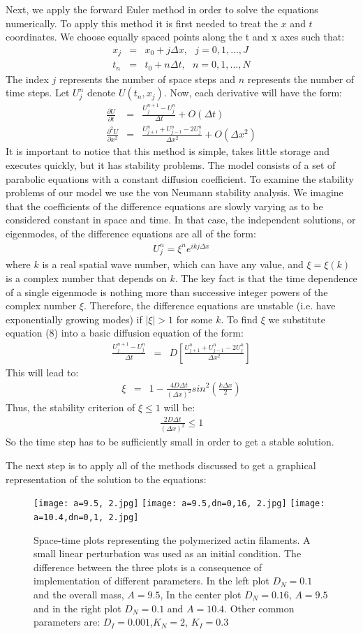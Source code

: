 \documentclass[aps,pre,floats,floatfix,twocolumn]{revtex4-1}
\newcommand{\beq}{\begin{eqnarray}}
\newcommand{\eeq}{\end{eqnarray}}
\begin{document}
Next, we apply the forward Euler method in order to solve the equations numerically. To apply this method it is first needed to treat the $x$ and $t$ coordinates. We choose equally spaced points along the t and x axes such that:
\beq
    x_j&=&x_0+j{\Delta}x, \ \ \ j=0,1,...,J\\\nonumber
     t_n&=&t_0+n{\Delta}t,\ \ \ n=0,1,...,N
\eeq
The index $j$ represents the number of space steps and $n$ represents the number of time steps. Let $U^{n}_j$ denote $U(t_n,x_j)$. Now, each derivative will have the form:
\begin{eqnarray}
    \frac{\partial U}{\partial t}&=&\frac{U^{n+1}_j-U^{n}_j}{\Delta t}+O({\Delta}t)\\\nonumber
     \frac{\partial^2 U}{\partial x^2}&=&\frac{U^{n}_{j+1}+U^n_{j-1}-2U^{n}_j}{\Delta x^2}+O({\Delta}x^2)
\end{eqnarray}
It is important to notice that this method is simple, takes little storage and executes quickly, but it has stability problems. The model consists of a set of parabolic equations with a constant diffusion coefficient. To examine the stability problems of our model we use the von Neumann stability analysis. We imagine that the coefficients of the difference equations are slowly varying as to be considered constant in space and time. In that case, the independent solutions, or eigenmodes, of the difference equations are all of the form:
\beq
{U^{n}_j={\xi}^{n}e^{ikj{\Delta}x}}
\eeq
where $k$ is a real spatial wave number, which can have any value, and $\xi=\xi(k)$ is a complex number that depends on $k$.
The key fact is that the time dependence of
a single eigenmode is nothing more than successive integer powers of the complex number $\xi$. Therefore, the difference equations are unstable (i.e. have exponentially growing modes) if $|\xi|>1$ for some $k$. To find $\xi$ we substitute equation (8) into a basic diffusion equation of the form:
\beq
\frac{U^{n+1}_j-U^{n}_j}{\Delta t}&=&D\left[\frac{U^{n}_{j+1}+U^n_{j-1}-2U^{n}_j}{\Delta x^2}\right]
\eeq
This will lead to:
\beq
{\xi}&=&1-\frac{4D{\Delta}t}{({\Delta}x)^2}sin^2\left(\frac{k{\Delta}x}{2}\right)
\eeq
Thus, the stability criterion of $\xi\leq1$ will be:
\beq
\frac{2D{\Delta}t}{({\Delta}x)^2}\leq1
\eeq
So the time step has to be sufficiently small in order to get a stable solution.

The next step is to apply all of the methods discussed to get a graphical representation of the solution to the equations:

\begin{figure}[hbt!]\centering
\texttt{[image: a=9.5, 2.jpg]}\hfill
\texttt{[image: a=9.5,dn=0,16, 2.jpg]}\hfill
\texttt{[image: a=10.4,dn=0,1, 2.jpg]}
\caption{\label{im1}Space-time plots representing the polymerized actin filaments. A small linear perturbation was used as an initial condition. The difference between the three plots is a consequence of implementation of different parameters. In the left plot $D_N=0.1$ and the overall mass, $A=9.5$, In the center plot $D_N=0.16$, $A=9.5$ and in the right plot $D_N=0.1$ and $A=10.4$. Other common parameters are: $D_I=0.001$,$K_N=2$, $K_I=0.3$} 
\end{figure}
\end{document}
